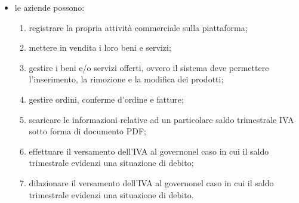 \begin{itemize}
\begin{enumerate}[label=\alph*.]
		\begin{itemize}
			\item \textbf{deposito dei beni}: il cliente, durante il procedimento di acquisto, versa la somma dovuta nella piattaforma, dove verrà momentaneamente trattenuta. Il cliente riceve una conferma d'ordine\glosp nella sezione apposita del proprio account, e l'ordine viene aggiunto alle vendite in attesa di conferma nella sezione apposita dell'account dell'azienda-venditrice. La vera fattura conterrà gli stessi dati della conferma d'ordine\glo, ma verrà compilata all'approvazione di quest'ultima, per poter riportare la data corretta. La compilazione sarà eseguita dal sistema, che sta agendo da garante nel meccanismo di escrow\glo, ed è attualmente in possesso di entrambi gli oggetti della transazione/scambio;
			\item \textbf{riscatto beni}: all'approvazione, esplicita o automatica, della conferma d'ordine da parte del cliente, esso riceve la fattura, mentre l'azienda-venditrice riceve l'ammontare trattenuto dal sistema e può accedere alla fattura a sua volta.
		\end{itemize}
		Questo sistema è atto a garantire che ad ogni ordine il cliente riceva la fattura per dimostrare l'acquisto effettuato, e che l'azienda-venditrice riceva il pagamento. Con l'adozione di tale meccanismo viene semplificata la gestione dell'IVA, in quanto tutte le fatture emesse sono state approvate, e quindi da considerarsi prive di errori. 
	\end{enumerate}
	\item le aziende possono:
	\begin{enumerate}[label=\alph*.]
		\item registrare la propria attività commerciale sulla piattaforma;
		\item mettere in vendita i loro beni e servizi;
		\item gestire i beni e/o servizi offerti, ovvero il sistema deve permettere l'inserimento, la rimozione e la modifica dei prodotti;
		\item gestire ordini, conferme d'ordine e fatture;
		
		\item scaricare le informazioni relative ad un particolare saldo trimestrale IVA  sotto forma di documento PDF;
		\item effettuare il versamento dell'IVA al governo\glosp nel caso in cui il saldo trimestrale evidenzi una situazione di debito;
		\item dilazionare il versamento dell'IVA al governo\glosp nel caso in cui il saldo trimestrale evidenzi una situazione di debito.
	\end{enumerate}

\end{itemize}
